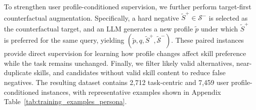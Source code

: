 \documentclass[letterpaper]{article} %
\begin{document}
To strengthen user profile-conditioned supervision, we further perform target-first counterfactual augmentation. Specifically, a hard negative $\tilde{S}^{+}\in\mathcal{S}^{-}$ is selected as the counterfactual target, and an LLM generates a new profile $\tilde{p}$ under which $\tilde{S}^{+}$ is preferred for the same query, yielding $(\tilde{p},q,\tilde{S}^{+},\tilde{\mathcal{S}}^{-})$. These paired instances provide direct supervision for learning how profile changes affect skill preference while the task remains unchanged. Finally, we filter likely valid alternatives, near-duplicate skills, and candidates without valid skill content to reduce false negatives. The resulting dataset contains 2,712 task-centric and 7,459 user profile-conditioned instances, with representative examples shown in Appendix Table~\ref{tab:training_examples_persona}.
\end{document}
